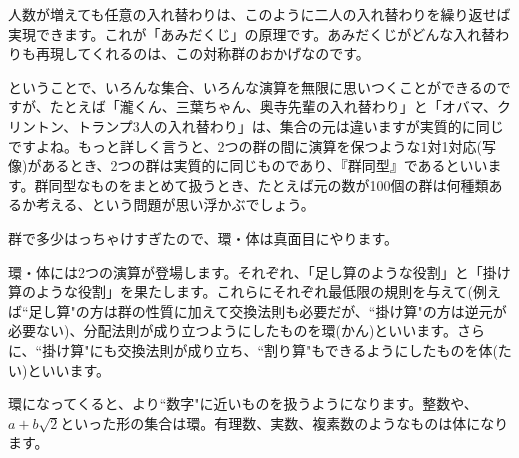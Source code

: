 人数が増えても任意の入れ替わりは、このように二人の入れ替わりを繰り返せば実現できます。これが「あみだくじ」の原理です。あみだくじがどんな入れ替わりも再現してくれるのは、この対称群のおかげなのです。

ということで、いろんな集合、いろんな演算を無限に思いつくことができるのですが、たとえば「瀧くん、三葉ちゃん、奥寺先輩の入れ替わり」と「オバマ、クリントン、トランプ3人の入れ替わり」は、集合の元は違いますが実質的に同じですよね。もっと詳しく言うと、2つの群の間に演算を保つような1対1対応(写像)があるとき、2つの群は実質的に同じものであり、『群同型』であるといいます。群同型なものをまとめて扱うとき、たとえば元の数が100個の群は何種類あるか考える、という問題が思い浮かぶでしょう。


群で多少はっちゃけすぎたので、環・体は真面目にやります。

環・体には2つの演算が登場します。それぞれ、「足し算のような役割」と「掛け算のような役割」を果たします。これらにそれぞれ最低限の規則を与えて(例えば``足し算"の方は群の性質に加えて交換法則も必要だが、``掛け算"の方は逆元が必要ない)、分配法則が成り立つようにしたものを環(かん)といいます。さらに、``掛け算"にも交換法則が成り立ち、``割り算"もできるようにしたものを体(たい)といいます。

環になってくると、より``数字"に近いものを扱うようになります。整数や、$a + b\sqrt{2}$といった形の集合は環。有理数、実数、複素数のようなものは体になります。


